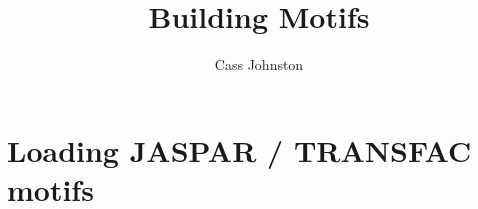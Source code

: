 \documentclass[a4paper]{article}
\begin{document}
\title{Building Motifs}
\author{Cass Johnston}
\maketitle

\section{Loading JASPAR / TRANSFAC motifs}
\end{document}
